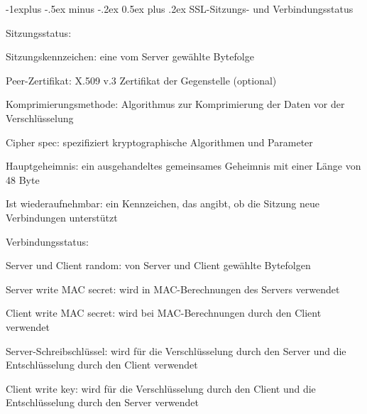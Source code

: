 \documentclass[a4paper]{article}
\makeatletter
\renewcommand{\subsection}{\@startsection{subsection}{2}{0mm}%
 {-1explus -.5ex minus -.2ex}%
 {0.5ex plus .2ex}%
 {\normalfont\normalsize\bfseries}}
\makeatother
\begin{document}
\begin{multicols}{3}
\begin{itemize*}
            \subsection{SSL-Sitzungs- und
                  Verbindungsstatus}
            \begin{itemize*}
                  \item       Sitzungsstatus:
                  \begin{itemize*}
                        \item Sitzungskennzeichen: eine vom Server gewählte Bytefolge
                        \item Peer-Zertifikat: X.509 v.3 Zertifikat der Gegenstelle (optional)
                        \item Komprimierungsmethode: Algorithmus zur Komprimierung der Daten vor der Verschlüsselung
                        \item Cipher spec: spezifiziert kryptographische Algorithmen und Parameter
                        \item Hauptgeheimnis: ein ausgehandeltes gemeinsames Geheimnis mit einer Länge von 48 Byte
                        \item Ist wiederaufnehmbar: ein Kennzeichen, das angibt, ob die Sitzung neue Verbindungen unterstützt
                  \end{itemize*}
                  \item       Verbindungsstatus:
                  \begin{itemize*}
                        \item Server und Client random: von Server und Client gewählte Bytefolgen
                        \item Server write MAC secret: wird in MAC-Berechnungen des Servers verwendet
                        \item Client write MAC secret: wird bei MAC-Berechnungen durch den Client verwendet
                        \item Server-Schreibschlüssel: wird für die Verschlüsselung durch den Server und die Entschlüsselung durch den Client verwendet
                        \item Client write key: wird für die Verschlüsselung durch den Client und die Entschlüsselung durch den Server verwendet
                  \end{itemize*}
            \end{itemize*}


\end{itemize*}
\end{multicols}
\end{document}
